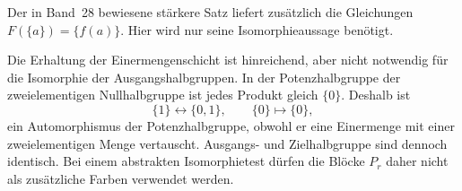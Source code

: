 \documentclass[main.tex]{subfiles}
\begin{document}
Der in Band~28 bewiesene stärkere Satz liefert zusätzlich die Gleichungen
\(F(\{a\})=\{f(a)\}\). Hier wird nur seine Isomorphieaussage benötigt.
\begin{tabproofwide}
\end{tabproofwide}

Die Erhaltung der Einermengenschicht ist hinreichend, aber nicht notwendig
für die Isomorphie der Ausgangshalbgruppen.  In der Potenzhalbgruppe der
zweielementigen Nullhalbgruppe ist jedes Produkt gleich \(\{0\}\).  Deshalb
ist
\[
  \{1\}\longleftrightarrow\{0,1\},
  \qquad \{0\}\longmapsto\{0\},
\]
ein Automorphismus der Potenzhalbgruppe, obwohl er eine Einermenge mit einer
zweielementigen Menge vertauscht.  Ausgangs- und Zielhalbgruppe sind dennoch
identisch.  Bei einem abstrakten Isomorphietest dürfen die Blöcke \(P_r\)
daher nicht als zusätzliche Farben verwendet werden.
\end{document}
